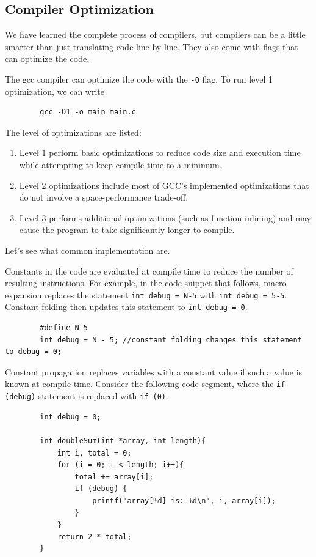 \documentclass{article}
\begin{document}
  \subsection{Compiler Optimization}

    We have learned the complete process of compilers, but compilers can be a little smarter than just translating code line by line. They also come with flags that can optimize the code. 

    \begin{definition}
      The gcc compiler can optimize the code with the \texttt{-O} flag. To run level 1 optimization, we can write 
      \begin{lstlisting}
        gcc -O1 -o main main.c
      \end{lstlisting}
      The level of optimizations are listed: 
      \begin{enumerate}
        \item Level 1 perform basic optimizations to reduce code size and execution time while attempting to keep compile time to a minimum. 
        \item Level 2 optimizations include most of GCC’s implemented optimizations that do not involve a space-performance trade-off. 
        \item Level 3 performs additional optimizations (such as function inlining) and may cause the program to take significantly longer to compile.
      \end{enumerate}
    \end{definition}

    Let's see what common implementation are. 

    \begin{definition}
      Constants in the code are evaluated at compile time to reduce the number of resulting instructions. For example, in the code snippet that follows, macro expansion replaces the statement \texttt{int debug = N-5} with \texttt{int debug = 5-5}. Constant folding then updates this statement to \texttt{int debug = 0}.
      \begin{lstlisting}
        #define N 5
        int debug = N - 5; //constant folding changes this statement to debug = 0; 
      \end{lstlisting}
    \end{definition}
    
    \begin{definition}
      Constant propagation replaces variables with a constant value if such a value is known at compile time. Consider the following code segment, where the \texttt{if (debug)} statement is replaced with \texttt{if (0)}.
      \begin{lstlisting}
        int debug = 0;

        int doubleSum(int *array, int length){
            int i, total = 0;
            for (i = 0; i < length; i++){
                total += array[i];
                if (debug) {
                    printf("array[%d] is: %d\n", i, array[i]);
                }
            }
            return 2 * total;
        }
      \end{lstlisting}
    \end{definition}
\end{document}
